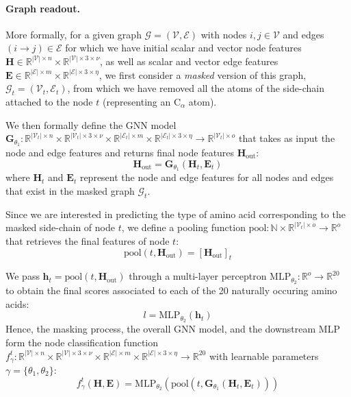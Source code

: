 \paragraph{Graph readout.} More formally, for a given graph $\mathcal{G} = (\mathcal{V}, \mathcal{E})$ with nodes $i,j \in \mathcal{V}$ and edges $(i \rightarrow j) \in \mathcal{E}$ for which we have initial scalar and vector node features $\mathbf{H}\in\mathbb{R}^{|\mathcal{V}|\times n}\times\mathbb{R}^{|\mathcal{V}|\times 3 \times \nu}$, as well as scalar and vector edge features $\mathbf{E}\in\mathbb{R}^{|\mathcal{E}|\times m}\times\mathbb{R}^{|\mathcal{E}|\times 3 \times \eta}$, we first consider a \textit{masked} version of this graph, $\mathcal{G}_t=(\mathcal{V}_t, \mathcal{E}_t)$, from which we have removed all the atoms of the side-chain attached to the node $t$ (representing an $\text{C}_{\alpha}$ atom). 

We then formally define the GNN model $\mathbf{G}_{\theta_1}:\mathbb{R}^{|\mathcal{V}_t|\times n}\times\mathbb{R}^{|\mathcal{V}_t|\times 3 \times \nu}\times\mathbb{R}^{|\mathcal{E}_t|\times m}\times\mathbb{R}^{|\mathcal{E}_t|\times 3 \times \eta}\rightarrow \mathbb{R}^{|\mathcal{V}_t|\times o}$ that takes as input the node and edge features and returns final node features  $\mathbf{H}_{\text{out}}$:
\begin{equation}
    \mathbf{H}_{\text{out}} = \mathbf{G}_{\theta_1}(\mathbf{H}_t, \mathbf{E}_t)
\end{equation}
where $\mathbf{H}_t$ and $\mathbf{E}_t$ represent the node and edge features for all nodes and edges that exist in the masked graph $\mathcal{G}_t$.

Since we are interested in predicting the type of amino acid corresponding to the masked side-chain of node $t$, we define a pooling function $\text{pool}:\mathbb{N}\times\mathbb{R}^{|\mathcal{V}_t|\times o}\rightarrow \mathbb{R}^o$ that retrieves the final features of node $t$:
\begin{equation}
    \text{pool}(t, \mathbf{H}_{\text{out}}) = [\mathbf{H}_{\text{out}}]_t
\end{equation}

We pass $\mathbf{h}_{t} = \text{pool}(t, \mathbf{H}_{\text{out}})$ through a multi-layer perceptron $\text{MLP}_{\theta_2}:\mathbb{R}^o\rightarrow \mathbb{R}^{20}$ to obtain the final scores associated to each of the 20 naturally occuring amino acids:
\begin{equation}
    l = \text{MLP}_{\theta_2}(\mathbf{h}_t)
\label{logit-scores}
\end{equation}
Hence, the masking process, the overall GNN model, and the downstream MLP form the node classification function $f_{\gamma}^t:\mathbb{R}^{|\mathcal{V}|\times n}\times\mathbb{R}^{|\mathcal{V}|\times 3 \times \nu}\times\mathbb{R}^{|\mathcal{E}|\times m}\times\mathbb{R}^{|\mathcal{E}|\times 3 \times \eta}\rightarrow \mathbb{R}^{20}$ with learnable parameters $\gamma = \{\theta_1, \theta_2\}$:
\begin{equation}
    f_{\gamma}^t(\mathbf{H}, \mathbf{E}) = \text{MLP}_{\theta_2}(\text{pool}(t, \mathbf{G}_{\theta_1}(\mathbf{H}_t, \mathbf{E}_t)))
\label{full-formalism}
\end{equation}

